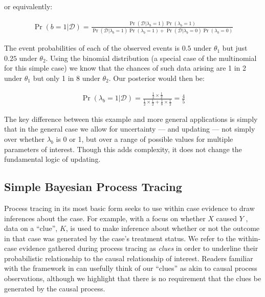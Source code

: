 \documentclass[12pt,]{book}
\begin{document}
or equivalently:

\begin{eqnarray*}
\Pr(b=1|\mathcal{D}) 
=\frac{\Pr(\mathcal{D}|\lambda_b=1)\Pr(\lambda_b=1)}{\Pr(\mathcal{D}|\lambda_b=1)\Pr(\lambda_b=1)+\Pr(\mathcal{D}|\lambda_b=0)\Pr(\lambda_b=0)}
\end{eqnarray*}

The event probabilities of each of the observed events is \(0.5\) under \(\theta_1\) but just \(0.25\) under \(\theta_2\). Using the binomial distribution (a special case of the multinomial for this simple case) we know that the chances of such data arising are 1 in 2 under \(\theta_1\) but only 1 in 8 under \(\theta_2\). Our posterior would then be:

\begin{eqnarray*}
\Pr(\lambda_b=1|\mathcal{D}) =\frac{\frac{1}{2} \times \frac{1}{2}}{\frac{1}{2} \times \frac{1}{2} + \frac{1}{8}\times \frac{1}{2}} = \frac{4}{5} 
\end{eqnarray*}

The key difference between this example and more general applications is simply that in the general case we allow for uncertainty --- and updating --- not simply over whether \(\lambda_b\) is 0 or 1, but over a range of possible values for multiple parameters of interest. Though this adds complexity, it does not change the fundamental logic of updating.

\hypertarget{simple-bayesian-process-tracing}{%
\subsection{Simple Bayesian Process Tracing}\label{simple-bayesian-process-tracing}}

Process tracing in its most basic form seeks to use within case evidence to draw inferences about the case. For example, with a focus on whether \(X\) caused \(Y\) , data on a ``clue'', \(K\), is used to make inference about whether or not the outcome in that case was generated by the case's treatment status. We refer to the within-case evidence gathered during process tracing as \emph{clues} in order to underline their probabilistic relationship to the causal relationship of interest. Readers familiar with the framework in \citet{collier2004sources} can usefully think of our ``clues'' as akin to causal process observations, although we highlight that there is no requirement that the clues be generated by the causal process.
\end{document}
